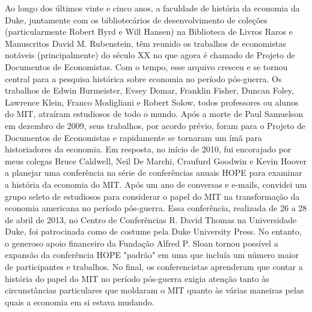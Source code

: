 \documentclass[12pt]{article}
\begin{document}
Ao longo dos últimos vinte e cinco anos, a faculdade de história da economia da Duke, juntamente com os bibliotecários de desenvolvimento de coleções (particularmente Robert Byrd e Will Hansen) na Biblioteca de Livros Raros e Manuscritos David M. Rubenstein, têm reunido os trabalhos de economistas notáveis (principalmente) do século XX no que agora é chamado de Projeto de Documentos de Economistas. Com o tempo, esse arquivo cresceu e se tornou central para a pesquisa histórica sobre economia no período pós-guerra. Os trabalhos de Edwin Burmeister, Evsey Domar, Franklin Fisher, Duncan Foley, Lawrence Klein, Franco Modigliani e Robert Solow, todos professores ou alunos do MIT, atraíram estudiosos de todo o mundo. Após a morte de Paul Samuelson em dezembro de 2009, seus trabalhos, por acordo prévio, foram para o Projeto de Documentos de Economistas e rapidamente se tornaram um ímã para historiadores da economia. Em resposta, no início de 2010, fui encorajado por meus colegas Bruce Caldwell, Neil De Marchi, Craufurd Goodwin e Kevin Hoover a planejar uma conferência na série de conferências anuais HOPE para examinar a história da economia do MIT. Após um ano de conversas e e-mails, convidei um grupo seleto de estudiosos para considerar o papel do MIT na transformação da economia americana no período pós-guerra. Essa conferência, realizada de 26 a 28 de abril de 2013, no Centro de Conferências R. David Thomas na Universidade Duke, foi patrocinada como de costume pela Duke University Press. No entanto, o generoso apoio financeiro da Fundação Alfred P. Sloan tornou possível a expansão da conferência HOPE "padrão" em uma que incluía um número maior de participantes e trabalhos. No final, os conferencistas aprenderam que contar a história do papel do MIT no período pós-guerra exigia atenção tanto às circunstâncias particulares que moldaram o MIT quanto às várias maneiras pelas quais a economia em si estava mudando.
\end{document}
